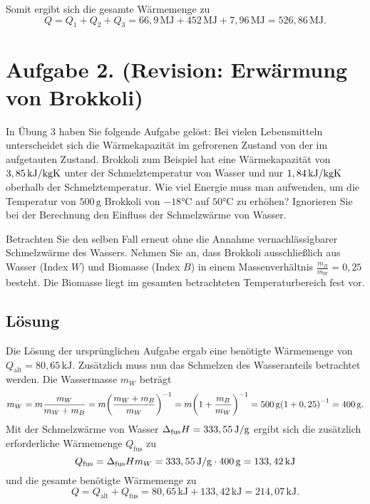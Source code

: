 \documentclass[german,12pt]{homework}
\DeclarePairedDelimiter{\enbrace}{(}{)}
\begin{document}
    Somit ergibt sich die gesamte Wärmemenge zu
    \[Q = Q_1 + Q_2 + Q_3 = 66,9\,\si{\mega\joule} + 452\,\si{\mega\joule} + 7,96\,\si{\mega\joule} = 526,86\,\si{\mega\joule}.\]

    \section*{Aufgabe 2. (Revision: Erwärmung von Brokkoli)}

    \begin{problem}
        In Übung 3 haben Sie folgende Aufgabe gelöst: Bei vielen Lebensmitteln unterscheidet sich die Wärmekapazität im gefrorenen Zustand von der im aufgetauten Zustand. Brokkoli zum Beispiel hat eine Wärmekapazität von \(3,85\,\si{\kilo\joule\per{\kg\kelvin}}\) unter der Schmelztemperatur von Wasser und nur \(1,84\,\si{\kilo\joule\per{\kg\kelvin}}\) oberhalb der Schmelztemperatur. Wie viel Energie muss man aufwenden, um die Temperatur von \(500\,\si{\g}\) Brokkoli von \(-18\si{\degreeCelsius}\) auf \(50\si{\degreeCelsius}\) zu erhöhen? Ignorieren Sie bei der Berechnung den Einfluss der Schmelzwärme von Wasser.

        Betrachten Sie den selben Fall erneut ohne die Annahme vernachlässigbarer Schmelzwärme des Wassers. Nehmen Sie an, dass Brokkoli ausschließlich aus Wasser (Index \(W\)) und Biomasse (Index \(B\)) in einem Massenverhältnis \(\frac{m_B}{m_W} = 0,25\) besteht. Die Biomasse liegt im gesamten betrachteten Temperaturbereich fest vor.
    \end{problem}

    \subsection*{Lösung} Die Lösung der ursprünglichen Aufgabe ergab eine benötigte Wärmemenge von \(Q_\text{alt} = 80,65\,\si{\kilo\joule}\). Zusätzlich muss nun das Schmelzen des Wasseranteils betrachtet werden. Die Wassermasse \(m_W\) beträgt
    \[m_W = m\frac{m_W}{m_W + m_B} = m\enbrace*{\frac{m_W + m_B}{m_W}}^{-1} = m\enbrace*{1 + \frac{m_B}{m_W}}^{-1} = 500\,\si{\g}\enbrace*{1 + 0,25}^{-1} = 400\,\si{\g}.\]
    Mit der Schmelzwärme von Wasser \(\Delta_\text{fus}H = 333,55\,\si{\joule\per{\g}}\) ergibt sich die zusätzlich erforderliche Wärmemenge \(Q_\text{fus}\) zu
    \[Q_\text{fus} = \Delta_\text{fus}Hm_W = 333,55\,\si{\joule\per{\g}} \cdot 400\,\si{\g} = 133,42\,\si{\kilo\joule}\]
    und die gesamte benötigte Wärmemenge zu
    \[Q = Q_\text{alt} + Q_\text{fus} = 80,65\,\si{\kilo\joule} + 133,42\,\si{\kilo\joule} = 214,07\,\si{\kilo\joule}.\]
\end{document}
